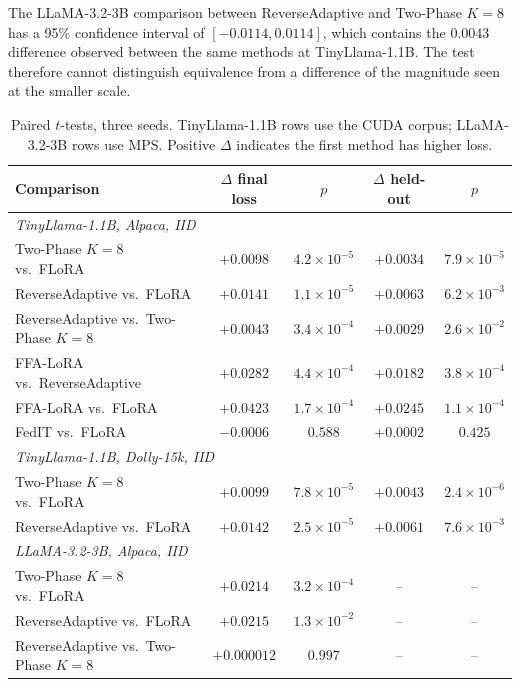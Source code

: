 The LLaMA-3.2-3B comparison between ReverseAdaptive and Two-Phase $K{=}8$ has a 95\% confidence interval of $[-0.0114, 0.0114]$, which contains the $0.0043$ difference observed between the same methods at TinyLlama-1.1B. The test therefore cannot distinguish equivalence from a difference of the magnitude seen at the smaller scale.

\begin{table}[H]
\caption{Paired $t$-tests, three seeds. TinyLlama-1.1B rows use the CUDA corpus; LLaMA-3.2-3B rows use MPS. Positive $\Delta$ indicates the first method has higher loss.}
\label{tab:d1}
\begin{center}
\footnotesize
\setlength{\tabcolsep}{3pt}
\begin{tabular}{lcccc}
\toprule
Comparison & $\Delta$ final loss & $p$ & $\Delta$ held-out & $p$ \\
\midrule
\multicolumn{5}{l}{\emph{TinyLlama-1.1B, Alpaca, IID}} \\
Two-Phase $K{=}8$ vs.\ FLoRA & $+0.0098$ & $4.2 \times 10^{-5}$ & $+0.0034$ & $7.9 \times 10^{-5}$ \\
ReverseAdaptive vs.\ FLoRA & $+0.0141$ & $1.1 \times 10^{-5}$ & $+0.0063$ & $6.2 \times 10^{-3}$ \\
ReverseAdaptive vs.\ Two-Phase $K{=}8$ & $+0.0043$ & $3.4 \times 10^{-4}$ & $+0.0029$ & $2.6 \times 10^{-2}$ \\
FFA-LoRA vs.\ ReverseAdaptive & $+0.0282$ & $4.4 \times 10^{-4}$ & $+0.0182$ & $3.8 \times 10^{-4}$ \\
FFA-LoRA vs.\ FLoRA & $+0.0423$ & $1.7 \times 10^{-4}$ & $+0.0245$ & $1.1 \times 10^{-4}$ \\
FedIT vs.\ FLoRA & $-0.0006$ & $0.588$ & $+0.0002$ & $0.425$ \\
\midrule
\multicolumn{5}{l}{\emph{TinyLlama-1.1B, Dolly-15k, IID}} \\
Two-Phase $K{=}8$ vs.\ FLoRA & $+0.0099$ & $7.8 \times 10^{-5}$ & $+0.0043$ & $2.4 \times 10^{-6}$ \\
ReverseAdaptive vs.\ FLoRA & $+0.0142$ & $2.5 \times 10^{-5}$ & $+0.0061$ & $7.6 \times 10^{-3}$ \\
\midrule
\multicolumn{5}{l}{\emph{LLaMA-3.2-3B, Alpaca, IID}} \\
Two-Phase $K{=}8$ vs.\ FLoRA & $+0.0214$ & $3.2 \times 10^{-4}$ & -- & -- \\
ReverseAdaptive vs.\ FLoRA & $+0.0215$ & $1.3 \times 10^{-2}$ & -- & -- \\
ReverseAdaptive vs.\ Two-Phase $K{=}8$ & $+0.000012$ & $0.997$ & -- & -- \\
\bottomrule
\end{tabular}
\end{center}
\end{table}

